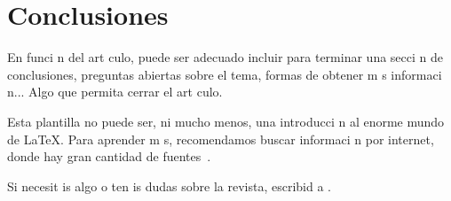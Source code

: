\documentclass{article}
\begin{document}
\section{Conclusiones}

En funci n del art culo, puede ser adecuado incluir para terminar una secci n de conclusiones, preguntas abiertas sobre el tema, formas de obtener m s informaci n...
Algo que permita cerrar el art culo.

Esta plantilla no puede ser, ni mucho menos, una introducci n al enorme mundo de \LaTeX.
Para aprender m s, recomendamos buscar informaci n por internet, donde hay gran cantidad de fuentes~\cite{wiki:latex, stackexchange, texample}.

Si necesit is algo o ten is dudas sobre la revista, escribid a .

\nocite{*}
\printbibliography[heading=bibintoc]
\end{document}
